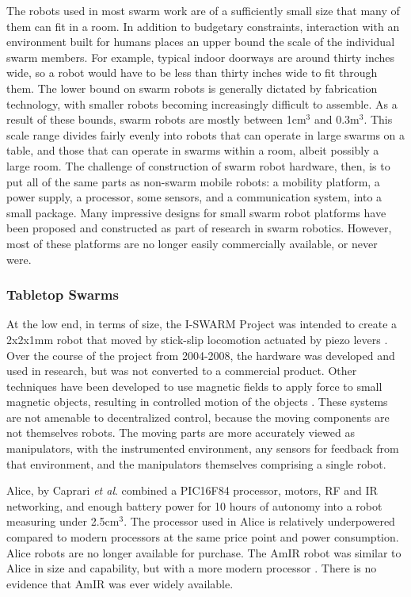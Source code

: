 \documentclass[]{article}
\begin{document}
The robots used in most swarm work are of a sufficiently small size that many of them can fit in a room. In addition to budgetary constraints, interaction with an environment built for humans places an upper bound the scale of the individual swarm members. 
For example, typical indoor doorways are around thirty inches wide, so a robot would have to be less than thirty inches wide to fit through them. 
The lower bound on swarm robots is generally dictated by fabrication technology, with smaller robots becoming increasingly difficult to assemble. 
As a result of these bounds, swarm robots are mostly between 1cm$^3$ and 0.3m$^3$. 
This scale range divides fairly evenly into robots that can operate in large swarms on a table, and those that can operate in swarms within a room, albeit possibly a large room. 
The challenge of construction of swarm robot hardware, then, is to put all of the same parts as non-swarm mobile robots: a mobility platform, a power supply, a processor, some sensors, and a communication system, into a small package.
Many impressive designs for small swarm robot platforms have been proposed and constructed as part of research in swarm robotics. 
However, most of these platforms are no longer easily commercially available, or never were. 

\subsubsection{Tabletop Swarms}

At the low end, in terms of size, the I-SWARM Project was intended to create a 2x2x1mm robot that moved by stick-slip locomotion actuated by piezo levers \cite{seyfried2005swarm}. 
Over the course of the project from 2004-2008, the hardware was developed and used in research, but was not converted to a commercial product.
Other techniques have been developed to use magnetic fields to apply force to small magnetic objects, resulting in controlled motion of the objects \cite{floyd2008untethered, pelrine2012diamagnetically}.
These systems are not amenable to decentralized control, because the moving components are not themselves robots. 
The moving parts are more accurately viewed as manipulators, with the instrumented environment, any sensors for feedback from that environment, and the manipulators themselves comprising a single robot. 

Alice, by Caprari \emph{et al}. \cite{caprari1998autonomous} combined a PIC16F84 processor, motors, RF and IR networking, and enough battery power for 10 hours of autonomy into a robot measuring under 2.5cm$^3$. 
The processor used in Alice is relatively underpowered compared to modern processors at the same price point and power consumption. 
Alice robots are no longer available for purchase. 
The AmIR robot was similar to Alice in size and capability, but with a more modern processor \cite{arvin2009development}.
There is no evidence that AmIR was ever widely available.
\end{document}
